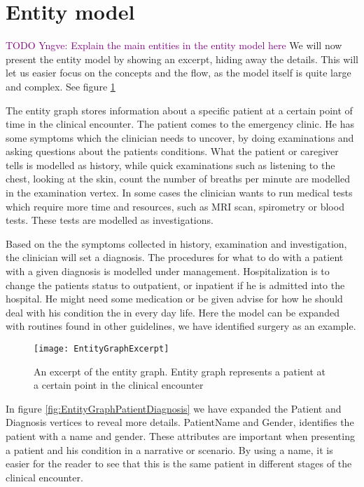 \section{Entity model}
\textcolor{purple}{TODO Yngve: Explain the main entities in the entity model here}
We will now present the entity model by showing an excerpt, hiding away the details. This will let us easier focus on the concepts and the flow, as the model itself is quite large and complex. See figure \ref{fig:EntityGraphExcerpt}

The entity graph stores information about a specific patient at a certain point of time in the clinical encounter. The patient comes to the emergency clinic. He has some symptoms which the clinician needs to uncover, by doing examinations and asking questions about the patients conditions. What the patient or caregiver tells is modelled as history, while quick examinations such as listening to the chest, looking at the skin, count the number of breaths per minute are modelled in the examination vertex. In some cases the clinician wants to run medical tests which require more time and resources, such as MRI scan, spirometry or blood tests. These tests are modelled as investigations.

Based on the the symptoms collected in history, examination and investigation, the clinician will set a diagnosis. The procedures for what to do with a patient with a given diagnosis is modelled under management. Hospitalization is to change the patients status to outpatient, or inpatient if he is admitted into the hospital. He might need some medication or be given advise for how he should deal with his condition the in every day life. Here the model can be expanded with routines found in other guidelines, we have identified surgery as an example. 

\begin{figure}[h!]
	\texttt{[image: EntityGraphExcerpt]}
	\caption {An excerpt of the entity graph. Entity graph represents a patient at a certain point in the clinical encounter}
	\label{fig:EntityGraphExcerpt}
\end{figure}

In figure \ref{fig:EntityGraphPatientDiagnosis} we have expanded the Patient and Diagnosis vertices to reveal more details. PatientName and Gender, identifies the patient with a name and gender. These attributes are important when presenting a patient and his condition in a narrative or scenario. By using a name, it is easier for the reader to see that this is the same patient in different stages of the clinical encounter.

